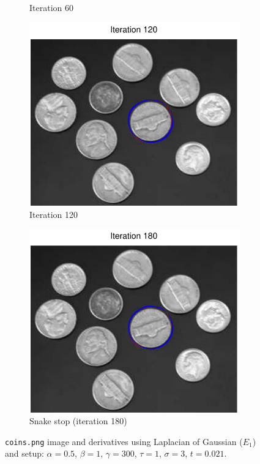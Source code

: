 \documentclass[11pt,a4paper]{article}
\begin{document}
\begin{figure}[H]
\begin{subfigure}[t]{0.21\textwidth}
        \caption{Iteration 60}
        \label{fig:coins_log_60}
    \end{subfigure}
    \begin{subfigure}[t]{0.21\textwidth}
        \includegraphics[width=\textwidth]{src/images/coins_log_120.pdf}
        \caption{Iteration 120}
        \label{fig:coins_log_120}
    \end{subfigure}
    \begin{subfigure}[t]{0.21\textwidth}
        \includegraphics[width=\textwidth]{src/images/coins_log_180.pdf}
        \caption{Snake stop (iteration 180)}
        \label{fig:coins_log_180}
    \end{subfigure}
    \caption{\texttt{coins.png} image and derivatives using Laplacian of
    Gaussian
($E_1$) and setup: $\alpha = 0.5$, $\beta = 1$, $\gamma = 300$, $\tau = 1$,
$\sigma = 3$, $t = 0.021$.}
    \label{fig:coins_log}
\end{figure}
\end{document}
